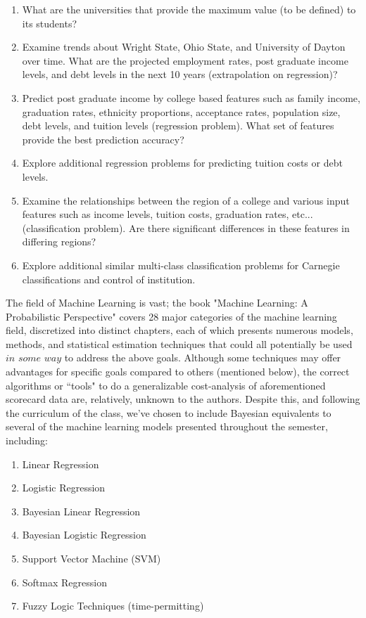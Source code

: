 \documentclass[10pt]{article}
\begin{document}
 \begin{enumerate}
    \item What are the universities that provide the maximum value (to be defined) to its students?
    \item Examine trends about Wright State, Ohio State, and University of Dayton over time. What are the projected employment rates, post graduate income levels, and debt levels in the next 10 years (extrapolation on regression)?
    \item Predict post graduate income by college based features such as family income, graduation rates, ethnicity proportions, acceptance rates, population size, debt levels, and tuition levels (regression problem). What set of features provide the best prediction accuracy?
    \item Explore additional regression problems for predicting tuition costs or debt levels.
    \item Examine the relationships between the region of a college and various input features such as income levels, tuition costs, graduation rates, etc... (classification problem). Are there significant differences in these features in differing regions?
    \item Explore additional similar multi-class classification problems for Carnegie classifications and control of institution.
\end{enumerate}

The field of Machine Learning is vast; the book "Machine Learning: A Probabilistic Perspective" \cite{murphy2012machine} covers 28 major categories of the machine learning field, discretized into distinct chapters, each of which presents numerous models, methods, and statistical estimation techniques that could all potentially be used $\textit{in some way}$ to address the above goals. Although some techniques may offer advantages for specific goals compared to others (mentioned below), the correct algorithms or ``tools" to do a generalizable cost-analysis of aforementioned scorecard data are, relatively, unknown to the authors. Despite this, and following the curriculum of the class, we've chosen to include Bayesian equivalents to several of the machine learning models presented throughout the semester, including: 
\begin{enumerate}
	\item Linear Regression
    \item Logistic Regression
    \item Bayesian Linear Regression 
    \item Bayesian Logistic Regression
    \item Support Vector Machine (SVM)
	\item Softmax Regression
    \item Fuzzy Logic Techniques (time-permitting)
\end{enumerate}
\end{document}

